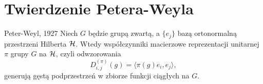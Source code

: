 \section{Twierdzenie Petera-Weyla}

\begin{theorem}{Peter-Weyl, 1927}{}
  Niech $G$ będzie grupą zwartą, a $\{e_j\}$ bazą ortonormalną przestrzeni Hilberta $\operatorname{\mathcal{H}}$. Wtedy współczynniki macierzowe reprezentacji unitarnej $\pi$ grupy $G$ na $\operatorname{\mathcal{H}}$, czyli odwzorowania
  $$D_{i,j}^{(\pi)}(g)=\langle\pi(g)e_i,e_j\rangle,$$
  generują gęstą podprzestrzeń w zbiorze funkcji ciągłych na $G$.
\end{theorem}


